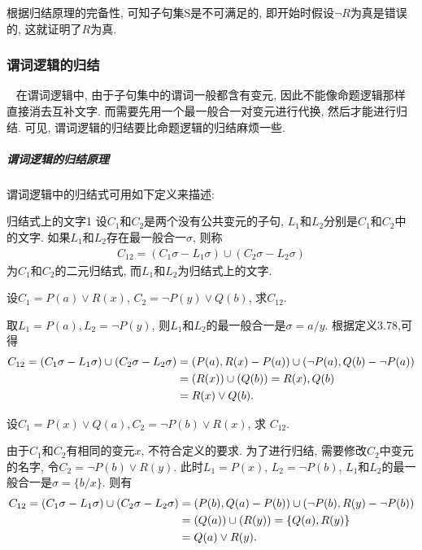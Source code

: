 根据归结原理的完备性, 可知子句集S是不可满足的, 即开始时假设$\neg R$为真是错误的, 这就证明了$R$为真.

\subsubsection{谓词逻辑的归结}~{}
    在谓词逻辑中, 由于子句集中的谓词一般都含有变元, 因此不能像命题逻辑那样直接消去互补文字. 而需要先用一个最一般合一对变元进行代换, 然后才能进行归结. 可见, 谓词逻辑的归结要比命题逻辑的归结麻烦一些.
\subparagraph{谓词逻辑的归结原理}
    谓词逻辑中的归结式可用如下定义来描述:
\begin{mydef}{归结式上的文字}{1}
    设$C_1$和$C_2$是两个没有公共变元的子句, $L_1$和$L_2$分别是$C_1$和$C_2$中的文字. 如果$L_1$和$L_2$存在最一般合一$\sigma$, 则称
    \begin{align}
      C_{12}=({C_1\sigma }-{ L_1\sigma })\cup ({ C_2\sigma }-{ L_2\sigma })
    \end{align}
    为$C_1$和$C_2$的二元归结式, 而$L_1$和$L_2$为归结式上的文字.\label{AI32Def321}
\end{mydef}
\begin{example}
  设$C_1=P(a)\vee R(x)$, $C_2=\neg P(y)\vee Q(b)$, 求$C_{12}$.
\end{example}
\begin{result}
取$L_1= P(a),  L_2=\neg P(y)$, 则$L_1$和$L_2$的最一般合一是$\sigma={a/y}$. 根据定义3.78,可得
\begin{align}
C_{12}=( {C_1\sigma }-{L_1\sigma }) \cup  ({C_2 \sigma }-{L_2\sigma })
              &=({P(a), R(x)}-{P(a)})\cup ({\neg P(a), Q(b)}-{\neg P(a)})\notag\\
              &=({R(x)})\cup({Q(b)})= {R(x), Q(b)}\notag\\
              &=R(x)\vee Q(b).
\end{align}
\end{result}
\begin{example}
    设$C_1=P(x)\vee Q(a), C_2=\neg P(b)\vee R(x)$, 求 $C_{12}$.
\end{example}
\begin{result}
由于$C_1$和$C_2$有相同的变元$x$, 不符合定义\label{defqibenzj}的要求. 为了进行归结, 需要修改$C_2$中变元的名字, 令$C_2=\neg P(b)\vee R(y)$.
此时$L_1= P(x)$, $L_2 =\neg P(b)$, $L_1$和$L_2$的最一般合一是$\sigma =\{b/x\}$. 则有
\begin{align}
C_{12}=( {C_1\sigma }-{L_1\sigma })\cup  ({C_2\sigma }-{L_2\sigma })
            &=({P(b), Q(a)}-{P(b)}) \cup  ({\neg P(b), R(y)}-{\neg P(b)})\notag\\
            &=({Q(a)}) \cup  ({R(y)})= \{Q(a), R(y)\}\notag\\
            &=Q(a)\vee R(y).
\end{align}
\end{result}

